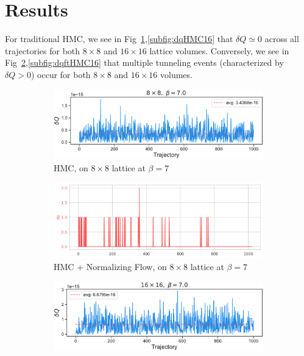 \documentclass[a4paper,11pt]{article}
\begin{document}
\section{\label{sec:results}Results}
%
For traditional HMC, we see in Fig~\ref{subfig:dqHMC8},\ref{subfig:dqHMC16}
that \(\delta Q \simeq 0\) across all trajectories for both \(8\times 8\) and
\(16\times 16\) lattice volumes.
%
Conversely, we see in Fig~\ref{subfig:dqftHMC8},\ref{subfig:dqftHMC16} that
multiple tunneling events (characterized by \(\delta Q > 0\)) occur for both
\(8 \times 8\) and \(16 \times 16\) volumes.
%
\begin{figure}[htpb]
    \centering
    \begin{subfigure}[b]{0.49\textwidth}
        \includegraphics[width=\textwidth]{assets/dqHMC_8x8_beta7.pdf}
        \caption{\label{subfig:dqHMC8}HMC, on \(8 \times 8\) lattice at
            \(\beta = 7\)}
    \end{subfigure}
    \hfill
    \begin{subfigure}[b]{0.49\textwidth}
        \includegraphics[width=\textwidth]{assets/fthmc_dq_live_8x8_beta7.png}
        \caption{\label{subfig:dqftHMC8}HMC + Normalizing Flow, on \(8 \times
        8\) lattice at \(\beta = 7\)}
    \end{subfigure}
    \begin{subfigure}[b]{0.49\textwidth}
        \includegraphics[width=\textwidth]{assets/dqHMC_16x16_beta7.pdf}

\end{subfigure}
\end{figure}
\end{document}
